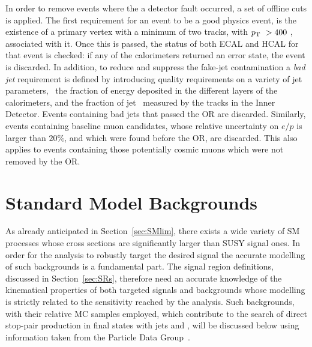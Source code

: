 			In order to remove events where the a detector fault occurred, a set of offline cuts is applied. The first requirement for an event to be a good physics event, is the existence of a primary vertex with a minimum of two tracks, with $p_{\mathrm{T}}\ > 400$ \MeV, associated with it. Once this is passed, the status of both \ac{ECAL} and \ac{HCAL} for that event is checked: if any of the calorimeters returned an error state, the event is discarded. In addition, to reduce and suppress the fake-jet contamination a \emph{bad jet} requirement is defined by introducing quality requirements on a variety of jet parameters, \eg\ the fraction of energy deposited in the different layers of the calorimeters, and the fraction of jet \pt\ measured by the tracks in the Inner Detector. Events containing bad jets that passed the \ac{OR} are discarded. Similarly, events containing baseline muon candidates, whose relative uncertainty on $e/p$ is larger than $20\%$, and which were found before the \ac{OR}, are discarded. This also applies to events containing those potentially cosmic muons which were not removed by the \ac{OR}.				


	\section{Standard Model Backgrounds}

		As already anticipated in Section~\ref{sec:SMlim}, there exists a wide variety of \ac{SM} processes whose cross sections are significantly larger than \ac{SUSY} signal ones. In order for the analysis to robustly target the desired signal the accurate modelling of such backgrounds is a fundamental part. The signal region definitions, discussed in Section~\ref{sec:SRs}, therefore need an accurate knowledge of the kinematical properties of both targeted signals and backgrounds whose modelling is strictly related to the sensitivity reached by the analysis. Such backgrounds, with their relative \ac{MC} samples employed, which contribute to the search of direct stop-pair production in final states with jets and \met, will be discussed below using information taken from the Particle Data Group~\cite{PDG}.

